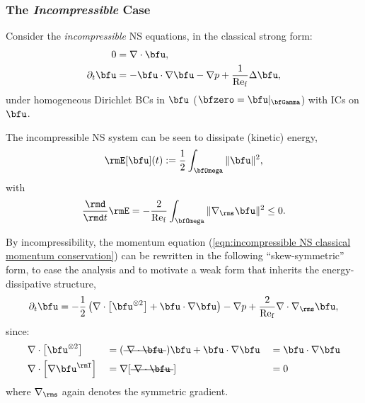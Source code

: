 \subsubsection*{The \emph{Incompressible} Case}
    Consider the \emph{incompressible} NS equations, in the classical strong form:
    \begin{align}
                       0  &=  \nabla\cdot\bfu,  \label{eqn:incompressible NS mass conservation}  \\
        \partial_{t}\bfu  &=  - \bfu\cdot\nabla\bfu - \nabla p + \frac{1}{\rmRef}\Delta\bfu,  \label{eqn:incompressible NS classical momentum conservation}
    \end{align}
    under homogeneous Dirichlet BCs in $\bfu$ ($\bfzero  =  \bfu|_{\bfGamma}$) with ICs on $\bfu$.
    
    \shortline

    The incompressible NS system can be seen to dissipate (kinetic) energy,
    \begin{equation}\label{eqn:incompressible NS energy definition}
        \rmE[\bfu](t)  :=  \frac{1}{2}\int_{\bfOmega}\|\bfu\|^{2},
    \end{equation}
    with
    \begin{equation}
        \frac{\rmd}{\rmd t}\rmE  =  - \frac{2}{\rmRef}\int_{\bfOmega}\|\nabla_{\rms}\bfu\|^{2}  \leq  0.
    \end{equation}

    \shortline

    By incompressibility, the momentum equation (\ref{eqn:incompressible NS classical momentum conservation}) can be rewritten in the following ``skew-symmetric'' form, to ease the analysis and to motivate a weak form that inherits the energy-dissipative structure,
    \begin{equation}\label{eqn:incompressible NS skew-symmetric momentum equation}
        \partial_{t}\bfu  =  - \frac{1}{2}\left(\nabla\cdot\left[\bfu^{\otimes 2}\right] + \bfu\cdot\nabla\bfu\right) - \nabla p + \frac{2}{\rmRef}\nabla\cdot\nabla_{\rms}\bfu,
    \end{equation}
    since:
    \begin{align}
        &\nabla\cdot\left[\bfu^{\otimes 2}\right]   &&=  (\mst{\nabla\cdot\bfu})\bfu + \bfu\cdot\nabla\bfu  &&=  \bfu\cdot\nabla\bfu  \\
        &\nabla\cdot\left[\nabla\bfu^{\rmT}\right]  &&=  \nabla[\mst{\nabla\cdot\bfu}]                      &&=  0
    \end{align}
    where $\nabla_{\rms}$ again denotes the symmetric gradient.

